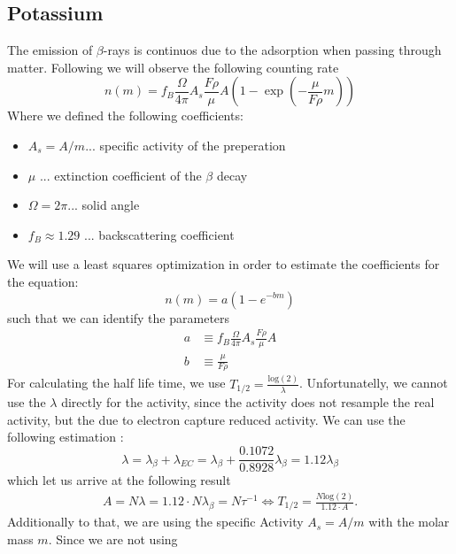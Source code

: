 \subsection{Potassium}
\label{subsec:potassium}
The emission of $\beta$-rays is continuos due to the adsorption when
passing through matter. Following \cite{ver} we will observe the following
counting rate
\begin{equation}
n(m) = f_B \frac{\Omega}{4 \pi} A_s \frac{F \rho }{\mu}A \left (1 - \exp \left ( - \frac{\mu}{F \rho}m \right ) \right )
\label{eq:potassium}
\end{equation}
Where we defined the following coefficients:
\begin{itemize}
\item[] $A_s = A/ m$... specific activity of the preperation  
\item[] $\mu$ ... extinction coefficient  of the $\beta$ decay 
\item[] $\Omega = 2 \pi$... solid angle
\item[] $f_B\approx 1.29$ ... backscattering coefficient 
\end{itemize}
We will use a least squares optimization in order to estimate the coefficients for the equation:
\begin{equation}
n(m) = a ( 1 - e^{-bm})
\end{equation}
such that we can identify the parameters
\begin{align}
a &\equiv  f_B \frac{\Omega}{4 \pi} A_s \frac{F \rho }{\mu}A  \label{eq:a}\\ 
b &\equiv \frac{\mu}{F \rho} \label{eq:b}
\end{align}
For calculating the half life time, we use $T_{1/2} = \frac{\mathrm{log}(2)}{\lambda}$. Unfortunatelly,
we cannot use the $\lambda$ directly for the activity, since the activity does not resample the real activity, but
the due to electron capture reduced activity. We can use the following estimation \cite{ver}:
\begin{equation}
\lambda = \lambda_{\beta} + \lambda_{EC} = \lambda_{\beta} + \frac{0.1072}{0.8928}\lambda_{\beta} = 1.12 \lambda_{\beta}
\end{equation}
which let us arrive at the following result
\begin{align}
A = N \lambda = 1.12 \cdot N\lambda_\beta= N \tau ^{-1} \Leftrightarrow  T_{1/2} = \frac{N \mathrm{log}(2)}{1.12 \cdot A}.
\label{eq:As}
\end{align}
Additionally to that, we are using the specific Activity $A_s = A / m$ with the molar mass $m$. Since we are not using
